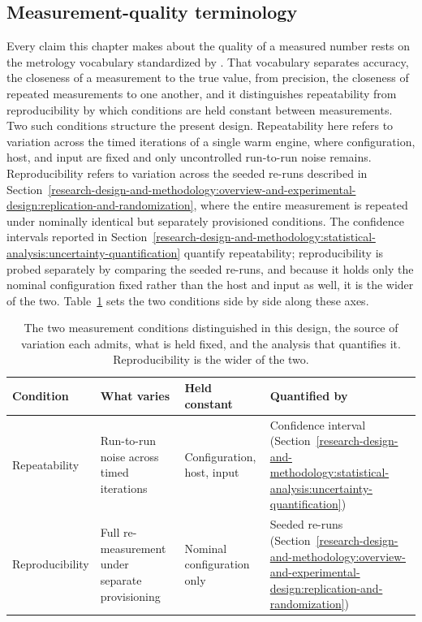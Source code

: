 \subsection{Measurement-quality terminology}
\label{research-design-and-methodology:statistical-analysis:measurement-quality-terminology}
Every claim this chapter makes about the quality of a measured number rests on the metrology vocabulary standardized by \textcite{jcgm2012_international_vocabulary_of_metrology}. That vocabulary separates accuracy, the closeness of a measurement to the true value, from precision, the closeness of repeated measurements to one another, and it distinguishes repeatability from reproducibility by which conditions are held constant between measurements. Two such conditions structure the present design. Repeatability here refers to variation across the timed iterations of a single warm engine, where configuration, host, and input are fixed and only uncontrolled run-to-run noise remains. Reproducibility refers to variation across the seeded re-runs described in Section~\ref{research-design-and-methodology:overview-and-experimental-design:replication-and-randomization}, where the entire measurement is repeated under nominally identical but separately provisioned conditions. The confidence intervals reported in Section~\ref{research-design-and-methodology:statistical-analysis:uncertainty-quantification} quantify repeatability; reproducibility is probed separately by comparing the seeded re-runs, and because it holds only the nominal configuration fixed rather than the host and input as well, it is the wider of the two. Table~\ref{tab:repeatability-vs-reproducibility} sets the two conditions side by side along these axes.

\begin{table}[H]
	\centering
	\begin{tabular}{@{}l >{\raggedright\arraybackslash}p{} >{\raggedright\arraybackslash}p{} >{\raggedright\arraybackslash}p{} @{}}
		\toprule
		Condition & What varies & Held constant & Quantified by \\
		\midrule
		Repeatability & Run-to-run noise across timed iterations & Configuration, host, input & Confidence interval (Section~\ref{research-design-and-methodology:statistical-analysis:uncertainty-quantification}) \\
		Reproducibility & Full re-measurement under separate provisioning & Nominal configuration only & Seeded re-runs (Section~\ref{research-design-and-methodology:overview-and-experimental-design:replication-and-randomization}) \\
		\bottomrule
	\end{tabular}
	\caption[Repeatability versus reproducibility]{The two measurement conditions distinguished in this design, the source of variation each admits, what is held fixed, and the analysis that quantifies it. Reproducibility is the wider of the two.}
	\label{tab:repeatability-vs-reproducibility}
\end{table}

